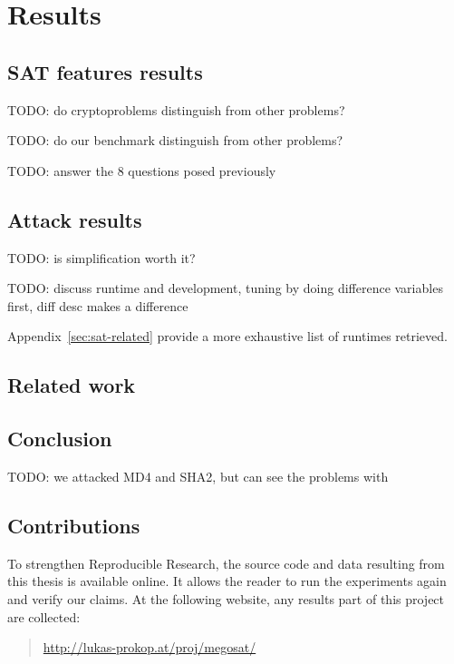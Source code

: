 \renewcommand*\chappic{img/megosat.pdf}
\renewcommand*\chapquote{}
\renewcommand*\chapquotesrc{}
\chapter{Results}
\label{ch:results}
%
\section{SAT features results}
\label{sec:results-features}

TODO: do cryptoproblems distinguish from other problems?

TODO: do our benchmark distinguish from other problems?

TODO: answer the 8 questions posed previously

\section{Attack results}
\label{sec:results-attacks}

TODO: is simplification worth it?

TODO: discuss runtime and development, tuning by doing difference variables first, diff desc makes a difference

Appendix~\ref{sec:sat-related} provide a more exhaustive list of runtimes retrieved.

\section{Related work}
\label{sec:results-related}

\section{Conclusion}
\label{sec:conclusion}

TODO: we attacked MD4 and SHA2, but can see the problems with

\section{Contributions}
\label{sec:contributions}
%
To strengthen Reproducible Research, the source code and data resulting from this thesis is available online.
It allows the reader to run the experiments again and verify our claims.
At the following website, any results part of this project are collected:

\begin{quote}
  \url{http://lukas-prokop.at/proj/megosat/}
\end{quote}

